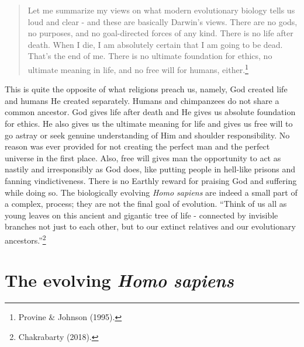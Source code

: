 \begin{multicols}{2}
\begin{quote}
Let me summarize my views on what modern evolutionary biology tells us loud and clear - and these are basically Darwin's views. There are no gods, no purposes, and no goal-directed forces of any kind. There is no life after death. When I die, I am absolutely certain that I am going to be dead. That's the end of me. There is no ultimate foundation for ethics, no ultimate meaning in life, and no free will for humans, either.\footnote{Provine \& Johnson (1995).}
\end{quote}

This is quite the opposite of what religions preach us, namely, God created life and humans He created separately. Humans and chimpanzees do not share a common ancestor. God gives life after death and He gives us absolute foundation for ethics. He also gives us the ultimate meaning for life and gives us free will to go astray or seek genuine understanding of Him and shoulder responsibility. No reason was ever provided for not creating the perfect man and the perfect universe in the first place. Also, free will gives man the opportunity to act as nastily and irresponsibly as God does, like putting people in hell-like prisons and fanning vindictiveness. There is no Earthly reward for praising God and suffering while doing so. The biologically evolving \textit{Homo sapiens} are indeed a small part of a complex, process; they are not the final goal of evolution. “Think of us all as young leaves on this ancient and gigantic tree of life - connected by invisible branches not just to each other, but to our extinct relatives and
our evolutionary ancestors.”\footnote{Chakrabarty (2018).}


\section{The evolving \textit{Homo sapiens}}
\vskip -9pt


\end{multicols}
